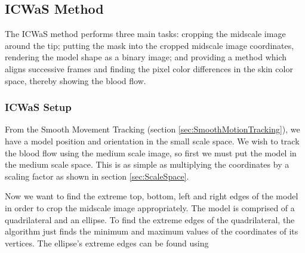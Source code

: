 \subsection{ICWaS Method}\label{sec:ICWaS}
The ICWaS method performs three main tasks: cropping the midscale image around the tip; putting the mask into the cropped midscale image coordinates, rendering the model shape as a binary image; and providing a method which aligns successive frames and finding the pixel color differences in the skin color space, thereby showing the blood flow.

\subsubsection{ICWaS Setup}\label{sec:ICWaSSetup}
From the Smooth Movement Tracking (section \ref{sec:SmoothMotionTracking}), we have a model position and orientation in the small scale space. We wish to track the blood flow using the medium scale image, so first we must put the model in the medium scale space. This is as simple as multiplying the coordinates by a scaling factor as shown in section \ref{sec:ScaleSpace}.

Now we want to find the extreme top, bottom, left and right edges of the model in order to crop the midscale image appropriately. The model is comprised of a quadrilateral and an ellipse. To find the extreme edges of the quadrilateral, the algorithm just finds the minimum and maximum values of the coordinates of its vertices. The ellipse's extreme edges can be found using

